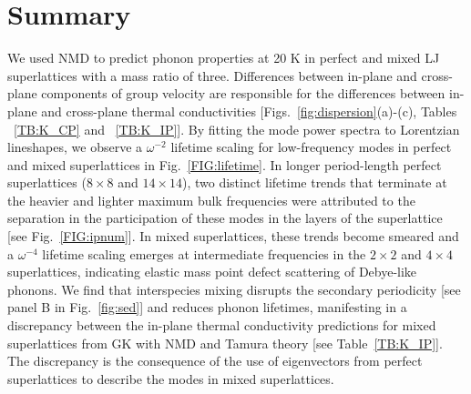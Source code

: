 \documentclass[aps,prb,preprint,preprintnumbers,amsmath,amssymb,floatfix,superscriptaddress]{revtex4}
\begin{document}


\section{Summary}

We used NMD to predict phonon properties at 20 K in perfect and mixed LJ superlattices with a mass ratio of three. Differences between in-plane and cross-plane components of group velocity are responsible for the differences between in-plane and cross-plane thermal conductivities [Figs.~\ref{fig:dispersion}(a)-(c), Tables ~\ref{TB:K_CP} and ~\ref{TB:K_IP}]. By fitting the mode power spectra to Lorentzian lineshapes, we observe a $\omega^{-2}$ lifetime scaling for low-frequency modes in perfect and mixed superlattices in Fig.~\ref{FIG:lifetime}. In longer period-length perfect superlattices ($8 \times 8$ and $14 \times 14$), two distinct lifetime trends that terminate at the heavier and lighter maximum bulk frequencies were attributed to the separation in the participation of these modes in the layers of the superlattice [see Fig.~\ref{FIG:ipnum}]. In mixed superlattices, these trends become smeared and a $\omega^{-4}$ lifetime scaling emerges at intermediate frequencies in the $2 \times 2$ and $4 \times 4$ superlattices, indicating elastic mass point defect scattering of Debye-like phonons. We find that interspecies mixing disrupts the secondary periodicity [see panel B in Fig.~\ref{fig:sed}] and reduces phonon lifetimes, manifesting in a discrepancy between the in-plane thermal conductivity predictions for mixed superlattices from GK with NMD and Tamura theory [see Table~\ref{TB:K_IP}]. The discrepancy is the consequence of the use of eigenvectors from perfect superlattices to describe the modes in mixed superlattices.
\end{document}

